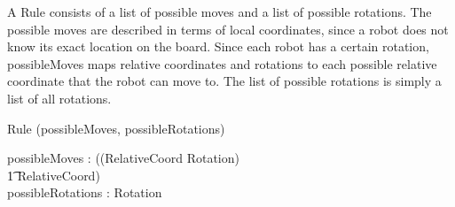 A Rule consists of a list of possible moves and a list of possible rotations. The possible moves are described in terms of local coordinates, since a robot does not know its exact location on the board. Since each robot has a certain rotation, possibleMoves maps relative coordinates and rotations to each possible relative coordinate that the robot can move to. The list of possible rotations is simply a list of all rotations.
\begin{class}{Rule}
\upharpoonright (possibleMoves, possibleRotations) \\
\begin{state}
possibleMoves : \power ((RelativeCoord \times Rotation) \psurj \\ \t1 \seq RelativeCoord) \\
possibleRotations : \power Rotation
\end{state} \\
\end{class}

